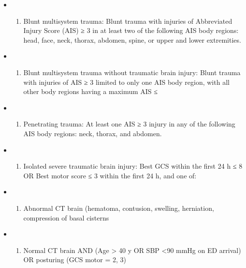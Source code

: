\documentclass[
]{article}
\providecommand{\tightlist}{%
  \setlength{\itemsep}{0pt}\setlength{\parskip}{0pt}}
\begin{document}
\begin{itemize}
\item
  \begin{enumerate}
  \def\labelenumi{\arabic{enumi}.}
  \tightlist
  \item
    Blunt multisystem trauma: Blunt trauma with injuries of Abbreviated
    Injury Score (AIS) ≥ 3 in at least two of the following AIS body
    regions: head, face, neck, thorax, abdomen, spine, or upper and
    lower extremities.
  \end{enumerate}
\item
  \begin{enumerate}
  \def\labelenumi{\arabic{enumi}.}
  \setcounter{enumi}{1}
  \tightlist
  \item
    Blunt multisystem trauma without traumatic brain injury: Blunt
    trauma with injuries of AIS ≥ 3 limited to only one AIS body region,
    with all other body regions having a maximum AIS ≤
  \end{enumerate}
\item
  \begin{enumerate}
  \def\labelenumi{\arabic{enumi}.}
  \setcounter{enumi}{2}
  \tightlist
  \item
    Penetrating trauma: At least one AIS ≥ 3 injury in any of the
    following AIS body regions: neck, thorax, and abdomen.
  \end{enumerate}
\item
  \begin{enumerate}
  \def\labelenumi{\arabic{enumi}.}
  \setcounter{enumi}{3}
  \tightlist
  \item
    Isolated severe traumatic brain injury: Best GCS within the first 24
    h ≤ 8 OR Best motor score ≤ 3 within the first 24 h, and one of:
  \end{enumerate}
\item
  \begin{enumerate}
  \def\labelenumi{\alph{enumi}.}
  \tightlist
  \item
    Abnormal CT brain (hematoma, contusion, swelling, herniation,
    compression of basal cisterns
  \end{enumerate}
\item
  \begin{enumerate}
  \def\labelenumi{\alph{enumi}.}
  \setcounter{enumi}{1}
  \tightlist
  \item
    Normal CT brain AND (Age \textgreater{} 40 y OR SBP \textless90 mmHg
    on ED arrival) OR posturing (GCS motor = 2, 3)
  \end{enumerate}
\end{itemize}
\end{document}
